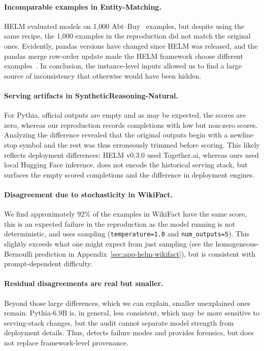 \paragraph{Incomparable examples in Entity-Matching.}
HELM evaluated models on 1{,}000 Abt--Buy~\cite{kopcke2010evaluation} examples, but
  despite using the same recipe, the 1{,}000 examples in the reproduction did not match the original ones.
Evidently, pandas versions have changed since HELM was released, and the pandas merge row-order update made the HELM framework choose different examples~\citep{mckinney2010data,pandas_merge_docs}. In conclusion, the instance-level inputs allowed us to find a large source of inconsistency that otherwise would have been hidden. 

\paragraph{Serving artifacts in SyntheticReasoning-Natural.}
For Pythia, official outputs are empty and as may be expected, the scores are zero, whereas
  our reproduction records completions with low but non-zero scores.
Analyzing the difference revealed that the original outputs begin with a newline stop symbol and the rest was thus erroneously trimmed before scoring.
This likely reflects deployment differences: HELM v0.3.0 used Together.ai,
  whereas ours used local Hugging Face inference.
\eee{} does not encode the historical serving stack, but surfaces the empty scored completions and the difference in deployment engines.

\paragraph{Disagreement due to stochasticity in WikiFact.}
We find approximately 92\% of the examples in WikiFact \citep{petroni-etal-2019-language} have the same score, this is an expected failure in the reproduction as the model running is not deterministic, and uses sampling (\texttt{temperature=1.0} and \texttt{num\_outputs=5}).
This slightly exceeds what one might expect from just sampling (see the homogeneous-Bernoulli prediction in Appendix~\ref{sec:app-helm-wikifact}), but is consistent with prompt-dependent difficulty.

\paragraph{Residual disagreements are real but smaller.}
Beyond those large differences, which we can explain, smaller unexplained ones remain. Pythia-6.9B is, in general, less consistent, which may be more sensitive to serving-stack
  changes, but the audit cannot separate model strength from deployment details.
Thus, \eee{} detects failure modes and provides forensics, but does not replace
  framework-level provenance.

